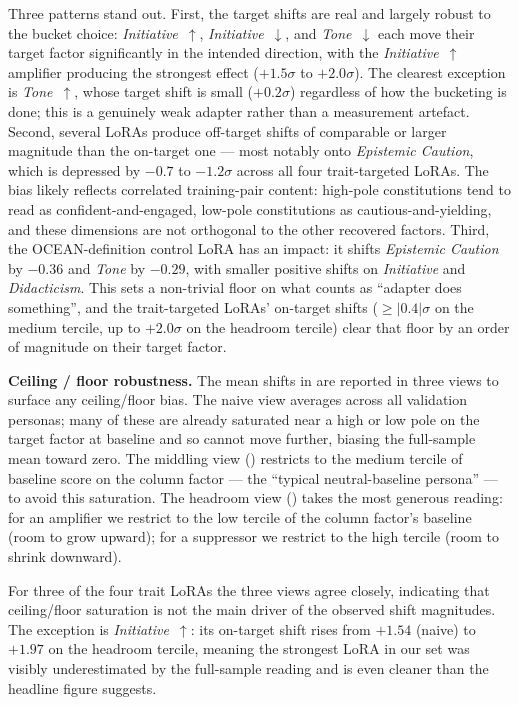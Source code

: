 Three patterns stand out.
First, the target shifts are real and largely robust to the bucket choice: \textit{Initiative}~$\uparrow$, \textit{Initiative}~$\downarrow$, and \textit{Tone}~$\downarrow$ each move their target factor significantly in the intended direction, with the \textit{Initiative}~$\uparrow$ amplifier producing the strongest effect ($+1.5\sigma$ to $+2.0\sigma$). The clearest exception is \textit{Tone}~$\uparrow$, whose target shift is small ($+0.2\sigma$) regardless of how the bucketing is done; this is a genuinely weak adapter rather than a measurement artefact.
Second, several LoRAs produce off-target shifts of comparable or larger magnitude than the on-target one --- most notably onto \textit{Epistemic Caution}, which is depressed by $-0.7$ to $-1.2\sigma$ across all four trait-targeted LoRAs. The bias likely reflects correlated training-pair content: high-pole constitutions tend to read as confident-and-engaged, low-pole constitutions as cautious-and-yielding, and these dimensions are not orthogonal to the other recovered factors.
Third, the OCEAN-definition control LoRA has an impact: it shifts \textit{Epistemic Caution} by $-0.36$ and \textit{Tone} by $-0.29$, with smaller positive shifts on \textit{Initiative} and \textit{Didacticism}. This sets a non-trivial floor on what counts as ``adapter does something'', and the trait-targeted LoRAs' on-target shifts ($\geq |0.4|\sigma$ on the medium tercile, up to $+2.0\sigma$ on the headroom tercile) clear that floor by an order of magnitude on their target factor.

\textbf{Ceiling / floor robustness.}
The mean shifts in  are reported in three views to surface any ceiling/floor bias.
The naive view averages across all validation personas; many of these are already saturated near a high or low pole on the target factor at baseline and so cannot move further, biasing the full-sample mean toward zero.
The middling view () restricts to the medium tercile of baseline score on the column factor --- the ``typical neutral-baseline persona'' --- to avoid this saturation.
The headroom view () takes the most generous reading: for an amplifier we restrict to the low tercile of the column factor's baseline (room to grow upward); for a suppressor we restrict to the high tercile (room to shrink downward).

For three of the four trait LoRAs the three views agree closely, indicating that ceiling/floor saturation is not the main driver of the observed shift magnitudes.
The exception is \textit{Initiative}~$\uparrow$: its on-target shift rises from $+1.54$ (naive) to $+1.97$ on the headroom tercile, meaning the strongest LoRA in our set was visibly underestimated by the full-sample reading and is even cleaner than the headline figure suggests.

